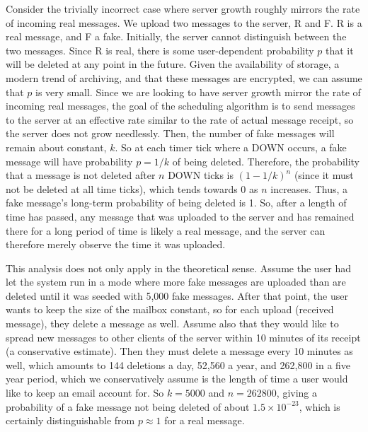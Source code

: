 \documentclass[pageno]{jpaper}
\begin{document}
Consider the trivially incorrect case where server growth roughly mirrors the rate of incoming real messages. We upload two messages to the server, R and F. R is a real message, and F a fake. Initially, the server cannot distinguish between the two messages. Since R is real, there is some user-dependent probability $p$ that it will be deleted at any point in the future. Given the availability of storage, a modern trend of archiving, and that these messages are encrypted, we can assume that $p$ is very small. Since we are looking to have server growth mirror the rate of incoming real messages, the goal of the scheduling algorithm is to send messages to the server at an effective rate similar to the rate of actual message receipt, so the server does not grow needlessly. Then, the number of fake messages will remain about constant, $k$. So at each timer tick where a DOWN occurs, a fake message will have probability $p=1/k$ of being deleted. Therefore, the probability that a message is not deleted after $n$ DOWN ticks is $(1-1/k)^n$ (since it must not be deleted at all time ticks), which tends towards 0 as $n$ increases. Thus, a fake message's long-term probability of being deleted is 1. So, after a length of time has passed, any message that was uploaded to the server and has remained there for a long period of time is likely a real message, and the server can therefore merely observe the time it was uploaded.

This analysis does not only apply in the theoretical sense. Assume the user had let the system run in a mode where more fake messages are uploaded than are deleted until it was seeded with 5,000 fake messages. After that point, the user wants to keep the size of the mailbox constant, so for each upload (received message), they delete a message as well. Assume also that they would like to spread new messages to other clients of the server within 10 minutes of its receipt (a conservative estimate). Then they must delete a message every 10 minutes as well, which amounts to 144 deletions a day, 52,560 a year, and 262,800 in a five year period, which we conservatively assume is the length of time a user would like to keep an email account for. So $k=5000$ and $n=262800$, giving a probability of a fake message not being deleted of about $1.5\times10^{-23}$, which is certainly distinguishable from $p \approx 1$ for a real message.
\end{document}
